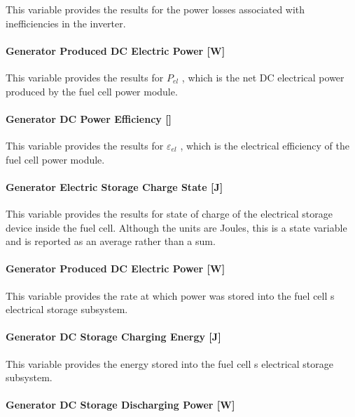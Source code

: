 This variable provides the results for the power losses associated with inefficiencies in the inverter.

\paragraph{Generator Produced DC Electric Power {[}W{]}}\label{generator-produced-dc-electric-power-w}

This variable provides the results for \({P_{el}}\) , which is the net DC electrical power produced by the fuel cell power module.

\paragraph{Generator DC Power Efficiency {[]}}\label{generator-dc-power-efficiency}

This variable provides the results for \({\varepsilon_{el}}\) , which is the electrical efficiency of the fuel cell power module.

\paragraph{Generator Electric Storage Charge State {[}J{]}}\label{generator-electric-storage-charge-state-j}

This variable provides the results for state of charge of the electrical storage device inside the fuel cell. Although the units are Joules, this is a state variable and is reported as an average rather than a sum.

\paragraph{Generator Produced DC Electric Power {[}W{]}}\label{generator-produced-dc-electric-power-w-1}

This variable provides the rate at which power was stored into the fuel cell s electrical storage subsystem.

\paragraph{Generator DC Storage Charging Energy {[}J{]}}\label{generator-dc-storage-charging-energy-j}

This variable provides the energy stored into the fuel cell s electrical storage subsystem.

\paragraph{Generator DC Storage Discharging Power {[}W{]}}\label{generator-dc-storage-discharging-power-w}

